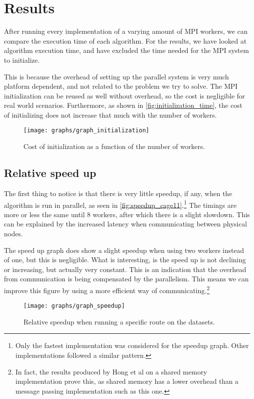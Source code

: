 \section{Results}
After running every implementation of a varying amount of MPI workers, we can compare the execution time of each algorithm. For the results, we have looked at algorithm execution time, and have excluded the time needed for the MPI system to initialize.

This is because the overhead of setting up the parallel system is very much platform dependent, and not related to the problem we try to solve. The MPI initialization can be reused as well without overhead, so the cost is negligible for real world scenarios. Furthermore, as shown in \autoref{fig:initialization_time}, the cost of initializing does not increase that much with the number of workers.

\begin{figure}
	\texttt{[image: graphs/graph\_initialization]}
  \caption{Cost of initialization as a function of the number of workers.}
  \label{fig:initialization_time}
\end{figure}

\subsection{Relative speed up}
The first thing to notice is that there is very little speedup, if any, when the algorithm is run in parallel, as seen in \autoref{fig:speedup_cage11}.\footnote{Only the fastest implementation was considered for the speedup graph. Other implementations followed a similar pattern.} The timings are more or less the same until 8 workers, after which there is a slight slowdown. This can be explained by the increased latency when communicating between physical nodes.

The speed up graph does show a slight speedup when using two workers instead of one, but this is negligible. What is interesting, is the speed up is not declining or increasing, but actually very constant. This is an indication that the overhead from communication is being compensated by the parallelism. This means we can improve this figure by using a more efficient way of communicating.\footnote{In fact, the results produced by Hong et al \cite{LockFreeMultithreadedMaxFlow} on a shared memory implementation prove this, as shared memory has a lower overhead than a message passing implementation such as this one.}

\begin{figure}
  \texttt{[image: graphs/graph\_speedup]}
  \caption{Relative speedup when running a specific route on the datasets.}
  \label{fig:speedup_cage11}
\end{figure}

